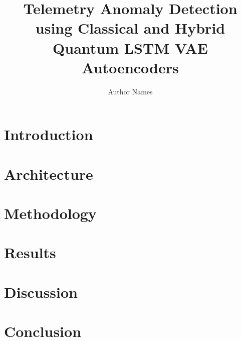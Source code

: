 \documentclass{IEEEtran}
\begin{document}
\title{Telemetry Anomaly Detection using Classical and Hybrid Quantum LSTM VAE Autoencoders}
\author{Author Names}
\date{}

\maketitle

\section{Introduction}


\section{Architecture}


\section{Methodology}


\section{Results}


\section{Discussion}


\section{Conclusion}

\end{document}
